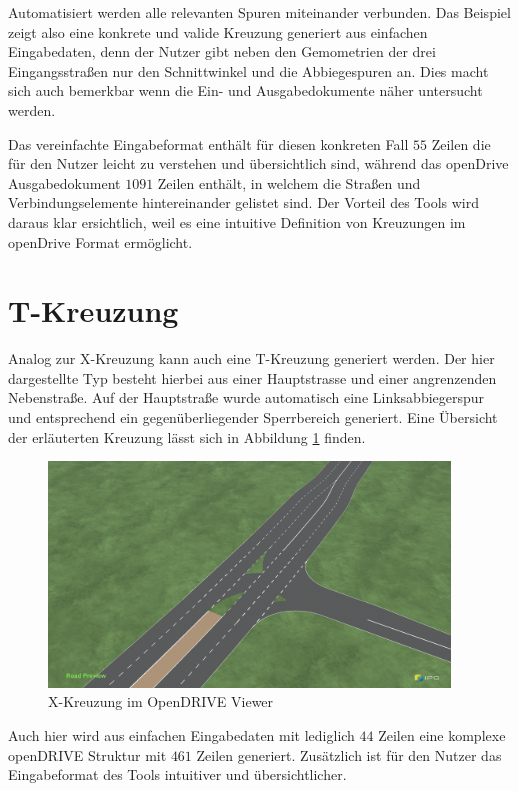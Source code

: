 Automatisiert werden alle relevanten Spuren miteinander verbunden. Das Beispiel zeigt also eine konkrete und valide Kreuzung generiert aus einfachen Eingabedaten, denn der Nutzer gibt neben den Gemometrien der drei Eingangsstraßen nur den Schnittwinkel und die Abbiegespuren an. Dies macht sich auch bemerkbar wenn die Ein- und Ausgabedokumente näher untersucht werden. 

Das vereinfachte Eingabeformat enthält für diesen konkreten Fall \(55\) Zeilen die für den Nutzer leicht zu verstehen und übersichtlich sind, während das openDrive Ausgabedokument \(1091\) Zeilen enthält, in welchem die Straßen und Verbindungselemente hintereinander gelistet sind. Der Vorteil des Tools wird daraus klar ersichtlich, weil es eine intuitive Definition von Kreuzungen im openDrive Format ermöglicht. 

\section{T-Kreuzung}
Analog zur X-Kreuzung kann auch eine T-Kreuzung generiert werden. Der hier dargestellte Typ besteht hierbei aus einer Hauptstrasse und einer angrenzenden Nebenstraße. Auf der Hauptstraße wurde automatisch eine Linksabbiegerspur und entsprechend ein gegenüberliegender Sperrbereich generiert. Eine Übersicht der erläuterten Kreuzung lässt sich in Abbildung \ref{abb7} finden.

\begin{figure}[H]
    \flushleft
    \includegraphics[width=0.95\textwidth]{fig/junction6.png}
    \caption{X-Kreuzung im OpenDRIVE Viewer}
    \label{abb7}
\end{figure}

Auch hier wird aus einfachen Eingabedaten mit lediglich \(44\) Zeilen eine komplexe openDRIVE Struktur mit \(461\) Zeilen generiert. Zusätzlich ist für den Nutzer das Eingabeformat des Tools intuitiver und übersichtlicher.

